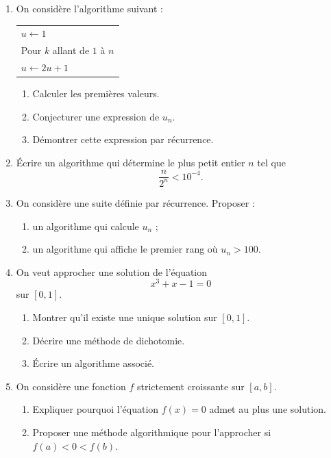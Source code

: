 \documentclass[11pt,a4paper]{article}
\begin{document}
\begin{enumerate}[label=\textbf{Exercice \arabic*.}, leftmargin=*, itemsep=1em]

\item On considère l'algorithme suivant :

\begin{center}
\begin{tabular}{l}
\(u\leftarrow 1\)\\
Pour \(k\) allant de \(1\) à \(n\)\\
\hspace{1em} \(u\leftarrow 2u+1\)
\end{tabular}
\end{center}

\begin{enumerate}[label=\alph*)]
    \item Calculer les premières valeurs.
    \item Conjecturer une expression de \(u_n\).
    \item Démontrer cette expression par récurrence.
\end{enumerate}

\item Écrire un algorithme qui détermine le plus petit entier \(n\) tel que
\[
\frac{n}{2^n}<10^{-4}.
\]

\item On considère une suite définie par récurrence.  
Proposer :

\begin{enumerate}[label=\alph*)]
    \item un algorithme qui calcule \(u_n\) ;
    \item un algorithme qui affiche le premier rang où \(u_n>100\).
\end{enumerate}

\item On veut approcher une solution de l'équation
\[
x^3+x-1=0
\]
sur \([0,1]\).

\begin{enumerate}[label=\alph*)]
    \item Montrer qu'il existe une unique solution sur \([0,1]\).
    \item Décrire une méthode de dichotomie.
    \item Écrire un algorithme associé.
\end{enumerate}

\item On considère une fonction \(f\) strictement croissante sur \([a,b]\).

\begin{enumerate}[label=\alph*)]
    \item Expliquer pourquoi l'équation \(f(x)=0\) admet au plus une solution.
    \item Proposer une méthode algorithmique pour l'approcher si \(f(a)<0<f(b)\).
\end{enumerate}

\end{enumerate}
\end{document}
